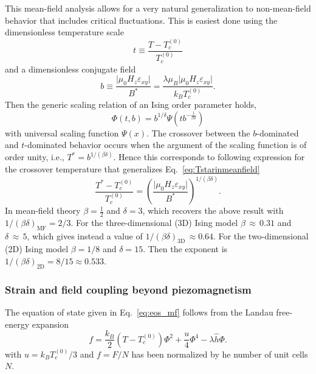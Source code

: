\documentclass[
 reprint,










 amsmath,amssymb,
 aps,






]{revtex4-2}
\begin{document}
This mean-field analysis allows for a very natural generalization to non-mean-field behavior that includes critical fluctuations. This is easiest done using the dimensionless temperature scale
\begin{equation}
    t\equiv\frac{T-T_c^{(0)}}{T_c^{(0)}}
\end{equation}
and a dimensionless conjugate field
\begin{equation}
    b\equiv\frac{\lvert\mu_0H_z\varepsilon_{xy}\rvert}{B^*}=\frac{\lambda\mu_B\lvert\mu_0H_z\varepsilon_{xy}\rvert}{k_BT_c^{(0)}}.
\end{equation}
Then the generic scaling relation of an Ising order parameter holds,
\begin{equation}
    \Phi(t, b) =b^{1/\delta}\Psi\left(tb^{-\frac{1}{\beta\delta}}\right)
\end{equation}
with  universal scaling function $\Psi(x)$. The crossover between the $b$-dominated and $t$-dominated behavior occurs when the argument of the scaling function is of order unity, i.e., $T^*=b^{1/(\beta\delta)}$. Hence this corresponds to following expression for the crossover temperature that generalizes Eq.~\eqref{eq:Tstarinmeanfield}
\begin{equation}
    \frac{T^*-T_c^{(0)}}{T_c^{(0)}}=\left(\frac{\lvert\mu_0H_z\varepsilon_{xy}\rvert}{B^*}\right)^{1/(\beta \delta)}.
\end{equation}
In mean-field theory $\beta =\frac{1}{2}$ and $\delta = 3$, which recovers the above result
with $1/(\beta\delta)_\textrm{MF} = 2/3$. For the three-dimensional (3D) Ising model $\beta\,\approx\,0.31$ and $\delta\,\approx\,5$, which gives instead a value of $1/(\beta\delta)_\textrm{3D}\,\approx 0.64$. For the two-dimensional (2D) Ising
model $\beta=1/8$ and $\delta=15$. Then the exponent is $1/(\beta\delta)_\textrm{2D}=8/15\approx 0.533$.

\subsubsection{Strain and field coupling beyond piezomagnetism}
\label{sec:strain-decomposition}

The equation of state given in Eq.~\eqref{eq:eos_mf} follows from the Landau free-energy expansion~\cite{Steward23,Chakarborty2025,Steward25}
\begin{equation}
     f=\frac{k_B}{2}\left(T-T_c^{(0)}\right)\Phi^2+ \frac{u}{4}\Phi^4-\lambda \hat{h}\Phi.
     \label{eq:free-energy}
\end{equation}
with $u=k_BT_c^{(0)}/3$ and $f=F/N$ has been normalized by he number of unit cells $N$.
\end{document}
